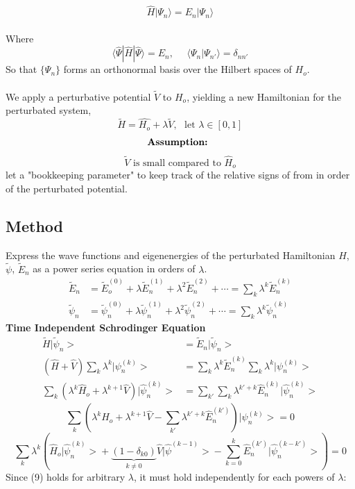\documentclass[12pt,fancychapters]{report}
\numberwithin{equation}{section}
\begin{document}
\begin{equation*}
	\hat{H} |\Psi_n \rangle = E_n |\Psi_n \rangle 
\end{equation*}
\\
Where
\\
$$\langle \hat{\Psi} |\hat{H}|\hat{\Psi} \rangle = E_n,\,\,\,\,\,\,\,\,
	\langle \Psi_n | \Psi_{n'} \rangle = \delta_{nn'} $$
So that $\{\Psi_n \}$ forms an orthonormal basis over the Hilbert spaces of $H_o$.\\
\\
We apply a perturbative potential $\tilde{V}$ to $H_o$, yielding a new Hamiltonian 
for the perturbated system,
\\
\begin{equation*}
  \tilde{H} = \hat{H_o} + \lambda \tilde{V},\,\,\,\,\text{let}\,\,\lambda \in [0,1]
\end{equation*}
$$\text{\textbf{Assumption: }}$$ 
$$ \tilde{V} \text{ is small compared to } \hat{H}_o $$
\noindent
let a "bookkeeping parameter" to keep track of the relative signs of from in order of the perturbated 
potential. 

\subsection{Method}
Express the wave functions and eigenenergies of the perturbated Hamiltonian $H$, $\tilde{\psi}$, $\tilde{E}_n$ 
as a power series equation in orders of $\lambda$.
\begin{align*}
	\tilde{E}_n & = \tilde{E}^{(0)}_o + \lambda \tilde{E}^{(1)}_n + \lambda^2 \tilde{E}^{(2)}_n
	+ \cdots = \sum_{k} \lambda^{k} \tilde{E}^{(k)}_n\\
	\tilde{\psi}_n & = \tilde{\psi}^{(0)}_n + \lambda \tilde{\psi}^{(1)}_n + \lambda^2 \tilde{\psi}^{(2)}_n 
	+ \cdots = \sum_{k} \lambda^k \tilde{\psi}^{(k)}_n
\end{align*}
\textbf{Time Independent Schrodinger Equation}
\begin{align*}
  \tilde{H} \big|\tilde{\psi}_n \big > & = \tilde{E}_n \big|\tilde{\psi}_n \big >\\
	(\hat{H} + \hat{V}) \sum_{k} \lambda^k \big| \psi^{(k)}_n \big > & = \sum_{k} \lambda^k \tilde{E}^{(k)}_n \sum_{k}
	\lambda^k \big|\psi^{(k)}_n \big>\\
	\sum_{k}(\lambda^k \hat{H}_o + \lambda^{k+1} \hat{V}) \big|\hat{\psi}^{(k)}_n \big > & = \sum_{k'} \sum_{k}
	\lambda^{k'+k} \hat{E}^{(k)}_n \big| \hat{\psi}^{(k)}_n \big >
\end{align*}
\begin{equation*}
	\sum_{k} \left(\lambda^k \hat{H}_o + \lambda^{k+1} \hat{V} - \sum_{k'} \lambda^{k'+ k}  
	\hat{E}^{(k')}_n \right ) \big|\psi^{(k)}_n \big > = 0 
\end{equation*}
\begin{equation*}
	\sum_{k} \lambda^{k} \left(\hat{H}_o \big| \hat{\psi}^{(k)}_n \big > + \underbrace{(1 - \delta_
	{k0})}_{k\neq 0} \hat{V} \big| \hat{\psi}^{(k-1)} \big > - \sum_{k=0}^{k} \hat{E}^{(k')}_n 
	\big | \hat{\psi}^{(k-k')}_n \big > \right ) = 0
\end{equation*}
Since (9) holds for arbitrary $\lambda$, it must hold independently for each powers of $\lambda$:
\end{document}
